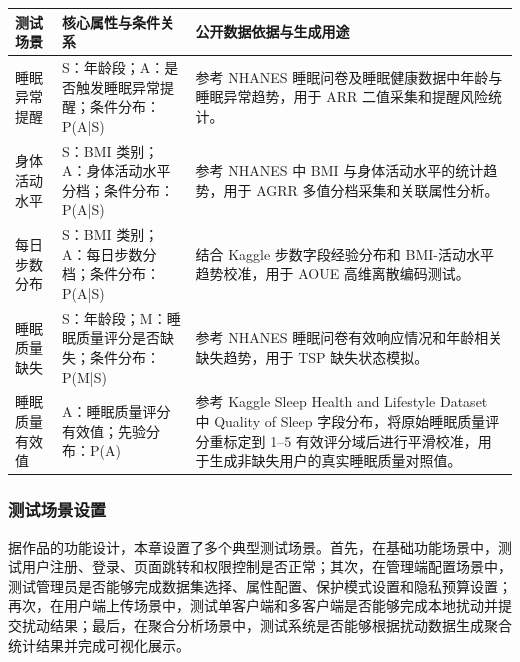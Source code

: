 \documentclass{cumcmthesis}
\numberwithin{equation}{section}
\numberwithin{figure}{section}
\numberwithin{table}{section}
\begin{document}
\begin{table}[htbp]
\centering
\small
\begin{tabularx}{\textwidth}{|>{\raggedright\arraybackslash}X|>{\raggedright\arraybackslash}X|>{\raggedright\arraybackslash}X|}
\hline
测试场景 & 核心属性与条件关系 & 公开数据依据与生成用途 \\ \hline
睡眠异常提醒 & S：年龄段；A：是否触发睡眠异常提醒；条件分布：P(A|S) & 参考 NHANES 睡眠问卷及睡眠健康数据中年龄与睡眠异常趋势，用于 ARR 二值采集和提醒风险统计。 \\ \hline
身体活动水平 & S：BMI 类别；A：身体活动水平分档；条件分布：P(A|S) & 参考 NHANES 中 BMI 与身体活动水平的统计趋势，用于 AGRR 多值分档采集和关联属性分析。 \\ \hline
每日步数分布 & S：BMI 类别；A：每日步数分档；条件分布：P(A|S) & 结合 Kaggle 步数字段经验分布和 BMI-活动水平趋势校准，用于 AOUE 高维离散编码测试。 \\ \hline
睡眠质量缺失 & S：年龄段；M：睡眠质量评分是否缺失；条件分布：P(M|S) & 参考 NHANES 睡眠问卷有效响应情况和年龄相关缺失趋势，用于 TSP 缺失状态模拟。 \\ \hline
睡眠质量有效值 & A：睡眠质量评分有效值；先验分布：P(A) & 参考 Kaggle Sleep Health and Lifestyle Dataset 中 Quality of Sleep 字段分布，将原始睡眠质量评分重标定到 1--5 有效评分域后进行平滑校准，用于生成非缺失用户的真实睡眠质量对照值。 \\ \hline
\end{tabularx}
\end{table}

\subsubsection{测试场景设置}

据作品的功能设计，本章设置了多个典型测试场景。首先，在基础功能场景中，测试用户注册、登录、页面跳转和权限控制是否正常；其次，在管理端配置场景中，测试管理员是否能够完成数据集选择、属性配置、保护模式设置和隐私预算设置；再次，在用户端上传场景中，测试单客户端和多客户端是否能够完成本地扰动并提交扰动结果；最后，在聚合分析场景中，测试系统是否能够根据扰动数据生成聚合统计结果并完成可视化展示。
\end{document}
